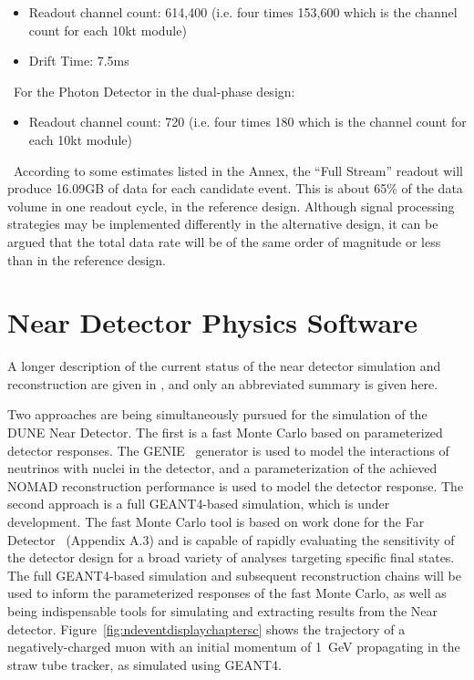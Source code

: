 \begin{itemize}
	\item Readout channel count: 614,400 (i.e. four times 153,600 which is the channel count
	for each 10kt module)
	\item Drift Time: 7.5ms
\end{itemize}
\
For the Photon Detector in the dual-phase design:
\begin{itemize}
	\item Readout channel count: 720 (i.e. four times 180 which is the channel count
	for each 10kt module)
\end{itemize}
\
According to some estimates listed in the Annex, the ``Full Stream'' readout will produce 16.09GB of data for
each candidate event. This is about 65\% of the data volume in one readout cycle, in the reference design.
Although signal processing strategies may be implemented differently in the alternative design, it can be argued
that the total data rate will be of the same order of magnitude or less than in the reference design.

\section{Near Detector Physics Software}
\label{sec:detectors-sc-nd-physics-software}

A longer description of the current status of the near detector simulation and reconstruction are given
in \anxreco, and only an abbreviated summary is given here.

Two approaches are being simultaneously pursued for the simulation of
the DUNE Near Detector.  The first is a fast Monte Carlo based on
parameterized detector responses. The GENIE~\cite{GENIE} generator is
used to model the interactions of neutrinos with nuclei in the
detector, and a parameterization of the achieved NOMAD 
reconstruction performance is used to model the detector response.
The second approach is a full GEANT4-based simulation, which is under
development.  The fast Monte Carlo tool is based on work done for the
Far Detector~\cite{Adams:2013qkq} (Appendix A.3) and is capable of
rapidly evaluating the sensitivity of the detector design for a broad
variety of analyses targeting specific final states.  The full
GEANT4-based simulation and subsequent reconstruction chains will be
used to inform the parameterized responses of the fast Monte Carlo, as
well as being indispensable tools for simulating and extracting
results from the Near detector.
Figure~\ref{fig:ndeventdisplaychaptersc} shows the trajectory of a
negatively-charged muon with an initial momentum of 1~GeV propagating
in the straw tube tracker, as simulated using GEANT4.

